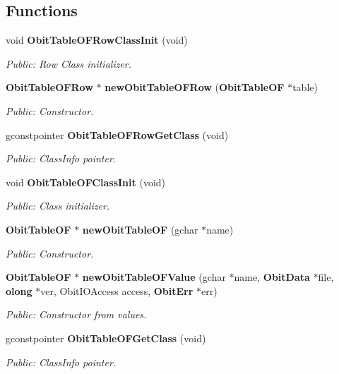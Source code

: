 \subsection*{Functions}
\begin{CompactItemize}
\item 
void {\bf Obit\-Table\-OFRow\-Class\-Init} (void)
\begin{CompactList}\small\item\em Public: Row Class initializer. \item\end{CompactList}\item 
{\bf Obit\-Table\-OFRow} $\ast$ {\bf new\-Obit\-Table\-OFRow} ({\bf Obit\-Table\-OF} $\ast$table)
\begin{CompactList}\small\item\em Public: Constructor. \item\end{CompactList}\item 
gconstpointer {\bf Obit\-Table\-OFRow\-Get\-Class} (void)
\begin{CompactList}\small\item\em Public: Class\-Info pointer. \item\end{CompactList}\item 
void {\bf Obit\-Table\-OFClass\-Init} (void)
\begin{CompactList}\small\item\em Public: Class initializer. \item\end{CompactList}\item 
{\bf Obit\-Table\-OF} $\ast$ {\bf new\-Obit\-Table\-OF} (gchar $\ast$name)
\begin{CompactList}\small\item\em Public: Constructor. \item\end{CompactList}\item 
{\bf Obit\-Table\-OF} $\ast$ {\bf new\-Obit\-Table\-OFValue} (gchar $\ast$name, {\bf Obit\-Data} $\ast$file, {\bf olong} $\ast$ver, Obit\-IOAccess access, {\bf Obit\-Err} $\ast$err)
\begin{CompactList}\small\item\em Public: Constructor from values. \item\end{CompactList}\item 
gconstpointer {\bf Obit\-Table\-OFGet\-Class} (void)
\begin{CompactList}\small\item\em Public: Class\-Info pointer. \item\end{CompactList}\item 

\end{CompactItemize}
